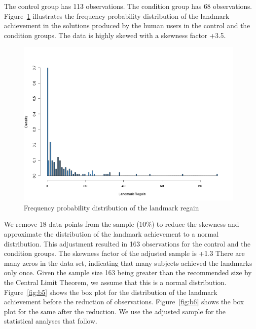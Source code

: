 The control group has 113 observations.
The condition group has 68 observations.
Figure~\ref{fig:histreg} illustrates the frequency probability distribution of the landmark achievement in the solutions produced by the human users in the control and the condition groups. 
The data is highly skewed with a skewness factor +3.5.
\begin{figure}[tpb]
  \centering
\includegraphics[width=0.7\columnwidth]{img/histo_regain.png}
  \caption{Frequency probability distribution of the landmark regain}
  \label{fig:histreg}
\end{figure}

We remove 18 data points from the sample (10\%) to reduce the skewness and approximate the distribution of the landmark achievement to a normal distribution.
This adjustment resulted in 163 observations for the control and the condition groups.
The skewness factor of the adjusted sample is +1.3
There are many zeros in the data set, indicating that many subjects achieved the landmarks only once.
Given the sample size 163 being greater than the recommended size by the Central Limit Theorem, we assume that this is a normal distribution.
Figure~\ref{fig:b5} shows the box plot for the distribution of the landmark achievement before the reduction of observations.
Figure~\ref{fig:b6} shows the box plot for the same after the reduction.
We use the adjusted sample for the statistical analyses that follow.

